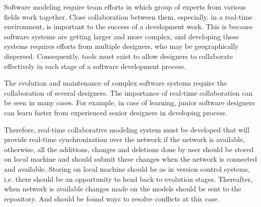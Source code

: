 
Software modeling require team efforts in which group of experts from various fields work together. Close collaboration between them, especially, in a real-time environment, is important to the success of a development work. This is because software systems are getting larger and more complex, and developing these systems requires efforts from multiple designers, who may be geographically dispersed. Consequently, tools must exist to allow designers to collaborate effectively in each stage of a software development process.

The evolution and maintenance of complex software systems require the collaboration of several designers. The importance of real-time collaboration can be seen in many cases. For example, in case of learning, junior software designers can learn faster from experienced senior designers in developing process.

Therefore, real-time collaborative modeling system must be developed that will provide real-time synchronization over the network if the network is available, otherwise, all the additions, changes and deletions done by user should be stored on local machine and should submit these changes when the network is connected and available. Storing on local machine should be as in version control systems, i.e. there should be an opportunity to head back to evolution stages. Thereafter, when network is available changes made on the models should be sent to the repository. And should be found ways to resolve conflicts at this case. 
